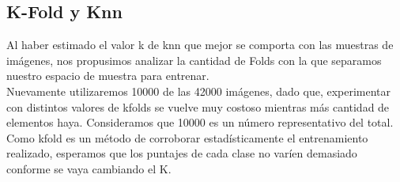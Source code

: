\subsection{K-Fold y Knn}

Al haber estimado el valor k de knn que mejor se comporta con las muestras de imágenes, nos propusimos analizar la cantidad de Folds con la que separamos nuestro espacio de muestra para entrenar.\\

Nuevamente utilizaremos 10000 de las 42000 imágenes, dado que, experimentar con distintos valores de kfolds se vuelve muy costoso mientras más cantidad de elementos haya. Consideramos que 10000 es un número representativo del total.\\

Como kfold es un método de corroborar estadísticamente el entrenamiento realizado, esperamos que los puntajes de cada clase no varíen demasiado conforme se vaya cambiando el K. \\

